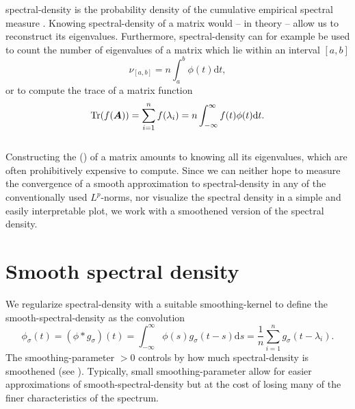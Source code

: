 \gls{spectral-density} is the probability density \cite{klenke2013probability}
of the cumulative empirical spectral measure \cite{chen2021slq}. Knowing \gls{spectral-density}
of a matrix would -- in theory -- allow us to reconstruct its eigenvalues.
Furthermore, \gls{spectral-density} can for example be used to count
the number of eigenvalues of a matrix which lie within an interval $[a, b]$
\begin{equation}
    \nu_{[a, b]} = n \int_{a}^{b} \phi(t) \mathrm{d}t,
    \label{equ:1-introduction-eigenvalue-counting}
\end{equation}
or to compute the trace of a matrix function \cite{lin2017randomized}
\begin{equation}
    \operatorname{Tr}(f(\boldsymbol{A})) = \sum_{i=1}^n f(\lambda_i) = n \int_{-\infty}^{\infty} f(t) \phi(t) \mathrm{d}t.
    \label{equ:1-introduction-matrix-trace}
\end{equation}\\

Constructing the  ()
of a matrix amounts to knowing all its eigenvalues, which are often prohibitively
expensive to compute. Since we can neither hope to measure the convergence
of a smooth approximation to \gls{spectral-density} in any of the conventionally
used $L^p$-norms, nor visualize the spectral density in a simple
and easily interpretable plot, we work with a
smoothened version of the spectral density.


\section{Smooth spectral density}
\label{sec:1-introduction-properties}

We regularize \gls{spectral-density} with a suitable \gls{smoothing-kernel}
to define the \gls{smooth-spectral-density} as the convolution
\begin{equation}
    \phi_{\sigma}(t) = (\phi \ast g_{\sigma})(t) = \int_{-\infty}^{\infty} \phi(s) g_{\sigma}(t - s) \mathrm{d}s = \frac{1}{n} \sum_{i=1}^{n} g_{\sigma}(t - \lambda_i).
    \label{equ:1-introduction-def-smooth-spectral-density}
\end{equation}
The \gls{smoothing-parameter} $>0$ controls by how much \gls{spectral-density} is
smoothened (see ). Typically,
small \gls{smoothing-parameter} allow for easier approximations of \gls{smooth-spectral-density}
but at the cost of losing many of the finer characteristics of the spectrum.\\

